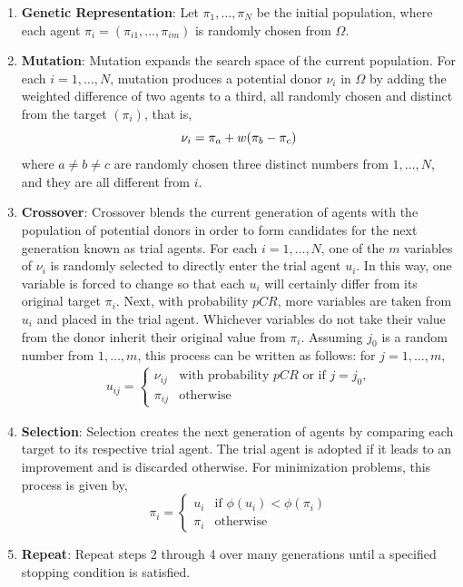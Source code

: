\documentclass [PhD] {package/uclathes}
\begin{document}
\begin{enumerate}
    \item \textbf{Genetic Representation}:
    Let $\pi_1, \ldots ,\pi_N$ be the initial population, where each agent $\pi_i = (\pi_{i1},\dots,\pi_{im})$ is randomly chosen from $\Omega$.
    \item \textbf{Mutation}:
    Mutation expands the search space of the current population.
    For each $i = 1, \ldots , N$, mutation produces a potential donor $\nu_i$ in $\Omega$ by adding the weighted difference of two agents to a third,  all randomly chosen and distinct from the target $(\pi_i)$, that is,
    \begin{equation}
        \nu_i = \pi_a + w(\pi_b - \pi_c)\\
        \label{mutation}
    \end{equation}
    where $a \neq b \neq c$ are randomly chosen three distinct numbers from $1,\dots, N$, and they are all different from $i$.
    \item \textbf{Crossover}:
    Crossover blends the current generation of agents with the population of potential donors in order to form candidates for the next generation known as trial agents. For each $i = 1,\dots, N$, one of the $m$ variables of $\nu_i$ is randomly selected to directly enter the trial agent $u_i$. In this way, one variable is forced to change so that each $u_i$ will
    certainly differ from its original target $\pi_i$. Next, with probability $pCR$, more variables are taken from $u_i$ and placed in the trial agent. Whichever variables do not take their value from the donor inherit their original value from $\pi_i$. Assuming $j_0$ is a random number from $1, \dots, m$, this process can be written as follows: for $j = 1,\dots, m,$
    $$
    \begin{aligned}
    u_{ij} = \begin{cases} \nu_{ij}& \text{with probability }pCR
    \text{ or if } j= j_0,\\ \pi_{ij}& \text{otherwise}\end{cases}
    \end{aligned}
    $$
    \item \textbf{Selection}:
    Selection creates the next generation of agents by comparing each target to its respective trial agent. The trial agent is adopted if it leads to an improvement and is discarded otherwise. For minimization problems, this process is given by,
    $$
    \pi_i = \begin{cases} u_i & \text{if } \phi(u_i) < \phi(\pi_i)\\
    \pi_i &\text{otherwise}  \end{cases}
    $$
    \item \textbf{Repeat}:
    Repeat steps 2 through 4 over many generations until a specified
    stopping condition is satisfied.
\end{enumerate}
\end{document}
